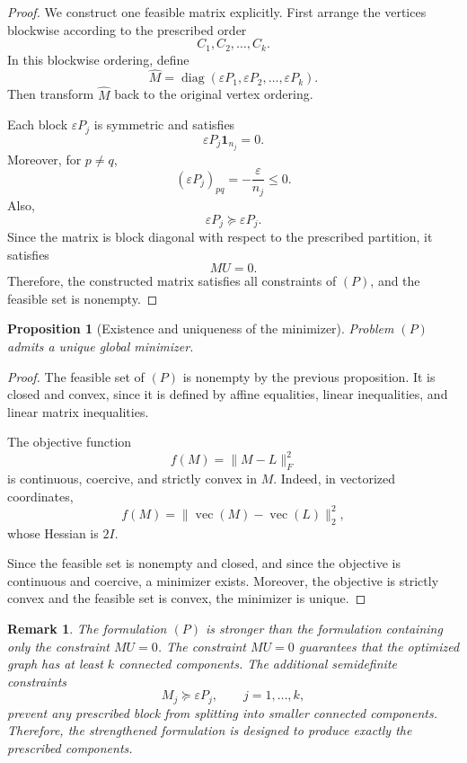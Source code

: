 \documentclass[11pt]{article}
\newtheorem{proposition}{Proposition}
\newtheorem{remark}[theorem]{Remark}
\begin{document}
	\begin{proof}
		We construct one feasible matrix explicitly. First arrange the vertices
		blockwise according to the prescribed order
		\[
		C_1,C_2,\ldots,C_k.
		\]
		In this blockwise ordering, define
		\[
		\widehat M
		=
		\operatorname{diag}(\varepsilon P_1,\varepsilon P_2,\ldots,\varepsilon P_k).
		\]
		Then transform $\widehat M$ back to the original vertex ordering.
		
		Each block $\varepsilon P_j$ is symmetric and satisfies
		\[
		\varepsilon P_j\mathbf 1_{n_j}=0.
		\]
		Moreover, for $p\ne q$,
		\[
		(\varepsilon P_j)_{pq}
		=
		-\frac{\varepsilon}{n_j}
		\le0.
		\]
		Also,
		\[
		\varepsilon P_j\succeq\varepsilon P_j.
		\]
		Since the matrix is block diagonal with respect to the prescribed partition, it
		satisfies
		\[
		MU=0.
		\]
		Therefore, the constructed matrix satisfies all constraints of $(P)$, and the
		feasible set is nonempty.
	\end{proof}
	
	\begin{proposition}[Existence and uniqueness of the minimizer]
		Problem $(P)$ admits a unique global minimizer.
	\end{proposition}
	
	\begin{proof}
		The feasible set of $(P)$ is nonempty by the previous proposition. It is closed
		and convex, since it is defined by affine equalities, linear inequalities, and
		linear matrix inequalities.
		
		The objective function
		\[
		f(M)=\|M-L\|_F^2
		\]
		is continuous, coercive, and strictly convex in $M$. Indeed, in vectorized
		coordinates,
		\[
		f(M)
		=
		\|\operatorname{vec}(M)-\operatorname{vec}(L)\|_2^2,
		\]
		whose Hessian is $2I$.
		
		Since the feasible set is nonempty and closed, and since the objective is
		continuous and coercive, a minimizer exists. Moreover, the objective is strictly
		convex and the feasible set is convex, the minimizer is unique.
	\end{proof}
	
	\begin{remark}
		The formulation $(P)$ is stronger than the formulation containing only the
		constraint $MU=0$. The constraint $MU=0$ guarantees that the optimized graph has
		at least $k$ connected components. The additional semidefinite constraints
		\[
		M_j\succeq \varepsilon P_j,\qquad j=1,\ldots,k,
		\]
		prevent any prescribed block from splitting into smaller connected components.
		Therefore, the strengthened formulation is designed to produce exactly the
		prescribed components.
	\end{remark}
	
\end{document}
